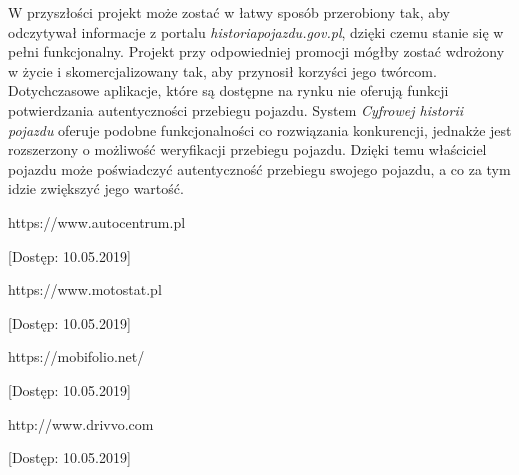 \documentclass[12pt]{article}
\begin{document}
W przyszłości projekt może zostać w łatwy sposób przerobiony tak, aby odczytywał informacje z portalu \textit{historiapojazdu.gov.pl}, dzięki czemu stanie się w pełni funkcjonalny. Projekt przy odpowiedniej promocji mógłby zostać wdrożony w życie i skomercjalizowany tak, aby przynosił korzyści jego twórcom. Dotychczasowe aplikacje, które są dostępne na rynku nie oferują funkcji potwierdzania autentyczności przebiegu pojazdu. System \textit{Cyfrowej historii pojazdu} oferuje podobne funkcjonalności co rozwiązania konkurencji, jednakże jest rozszerzony o możliwość weryfikacji przebiegu pojazdu. Dzięki temu właściciel pojazdu może poświadczyć autentyczność przebiegu swojego pojazdu, a co za tym idzie zwiększyć jego wartość.


\newpage
\renewcommand\refname{Bibliografia}
\begin{thebibliography}{9}

  https://www.autocentrum.pl

[Dostęp: 10.05.2019]

  https://www.motostat.pl

[Dostęp: 10.05.2019]

 https://mobifolio.net/

[Dostęp: 10.05.2019]

  http://www.drivvo.com

[Dostęp: 10.05.2019]
\end{thebibliography}
\end{document}
